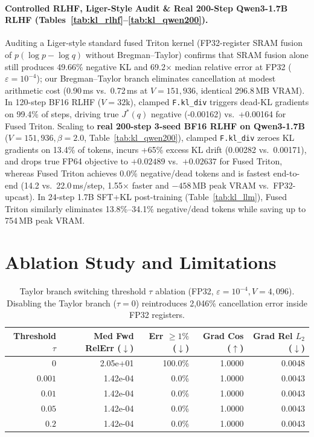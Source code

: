 \documentclass[10pt]{article}
\begin{document}
\paragraph{Controlled RLHF, Liger-Style Audit \& Real 200-Step Qwen3-1.7B RLHF (Tables~\ref{tab:kl_rlhf}--\ref{tab:kl_qwen200}).} Auditing a Liger-style standard fused Triton kernel (FP32-register SRAM fusion of $p(\log p - \log q)$ without Bregman--Taylor) confirms that SRAM fusion alone still produces 49.66\% negative KL and 69.2$\times$ median relative error at FP32 ($\varepsilon=10^{-4}$); our Bregman--Taylor branch eliminates cancellation at modest arithmetic cost (0.90\,ms vs.\ 0.72\,ms at $V=151{,}936$, identical 296.8\,MB VRAM). In 120-step BF16 RLHF ($V=32\text{k}$), clamped \texttt{F.kl\_div} triggers dead-KL gradients on 99.4\% of steps, driving true $J^*(q)$ negative (-0.00162) vs.\ +0.00164 for Fused Triton. Scaling to \textbf{real 200-step 3-seed BF16 RLHF on Qwen3-1.7B} ($V=151{,}936, \beta=2.0$, Table~\ref{tab:kl_qwen200}), clamped \texttt{F.kl\_div} zeroes KL gradients on 13.4\% of tokens, incurs +65\% excess KL drift (0.00282 vs.\ 0.00171), and drops true FP64 objective to $+0.02489$ vs.\ $+0.02637$ for Fused Triton, whereas Fused Triton achieves 0.0\% negative/dead tokens and is fastest end-to-end (14.2 vs.\ 22.0\,ms/step, 1.55$\times$ faster and $-458$\,MB peak VRAM vs.\ FP32-upcast). In 24-step 1.7B SFT+KL post-training (Table~\ref{tab:kl_llm}), Fused Triton similarly eliminates 13.8\%--34.1\% negative/dead tokens while saving up to 754\,MB peak VRAM.

\section{Ablation Study and Limitations}
\begin{table}[t]
  \centering
  \caption{Taylor branch switching threshold $\tau$ ablation (FP32, $\varepsilon=10^{-4}, V=4{,}096$). Disabling the Taylor branch ($\tau=0$) reintroduces 2,046\% cancellation error inside FP32 registers.}
  \label{tab:kl_ablation}
  \scriptsize
  \begin{tabular}{rrrrr}
    \toprule
    Threshold $\tau$ & Med Fwd RelErr ($\downarrow$) & Err $\ge 1\%$ ($\downarrow$) & Grad Cos ($\uparrow$) & Grad Rel $L_2$ ($\downarrow$) \\
    \midrule
        $0$ & 2.05e+01 & 100.0\% & 1.0000 & 0.0048 \\
    $0.001$ & 1.42e-04 & 0.0\% & 1.0000 & 0.0043 \\
    $0.01$ & 1.42e-04 & 0.0\% & 1.0000 & 0.0043 \\
    $0.05$ & 1.42e-04 & 0.0\% & 1.0000 & 0.0043 \\
    $0.2$ & 1.42e-04 & 0.0\% & 1.0000 & 0.0043 \\
    \bottomrule
  \end{tabular}
\end{table}
\end{document}

